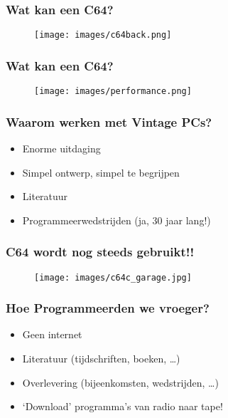 \documentclass[aspectratio=43]{uva-inf-presentation}
\begin{document}

\begin{frame}
\frametitle{Wat kan een C64?}

\begin{figure}
\texttt{[image: images/c64back.png]}
\end{figure}

\end{frame}


\begin{frame}
\frametitle{Wat kan een C64?}

\begin{figure}
\texttt{[image: images/performance.png]}
\end{figure}

\end{frame}


\begin{frame}
\frametitle{Waarom werken met Vintage PCs?}

\begin{itemize}
\item Enorme uitdaging
\item Simpel ontwerp, simpel te begrijpen
\item Literatuur
\item Programmeerwedstrijden (ja, 30 jaar lang!)
\end{itemize}

\end{frame}


\begin{frame}
\frametitle{C64 wordt nog steeds gebruikt!!}

\begin{figure}
\texttt{[image: images/c64c\_garage.jpg]}
\end{figure}

\end{frame}


\begin{frame}
\frametitle{Hoe Programmeerden we vroeger?}

\begin{itemize}
\item Geen internet
\item Literatuur (tijdschriften, boeken, \dots)
\item Overlevering (bijeenkomsten, wedstrijden, \dots)
\item `Download' programma's van radio naar tape!
\end{itemize}

\end{frame}
\end{document}
